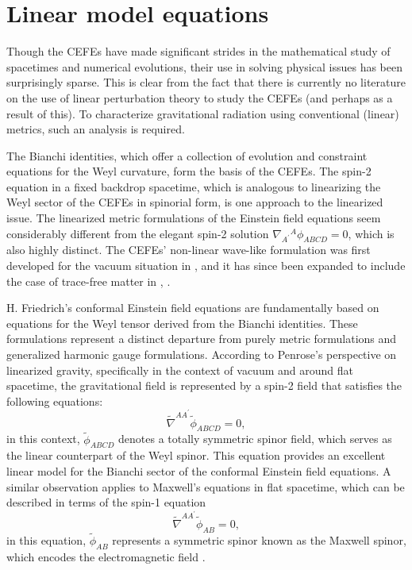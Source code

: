 \section{Linear model equations}
\label{sec:LinearModelEquations}
Though the CEFEs have made significant strides in the mathematical study of spacetimes and numerical evolutions, their use in solving physical issues has been surprisingly sparse. This is clear from the fact that there is currently no literature on the use of linear perturbation theory to study the CEFEs (and perhaps as a result of this). To characterize gravitational radiation using conventional (linear) metrics, such an analysis is required. 

The Bianchi identities, which offer a collection of evolution and constraint equations for the Weyl curvature, form the basis of the CEFEs. The spin-2 equation in a fixed backdrop spacetime, which is analogous to linearizing the Weyl sector of the CEFEs in spinorial form, is one approach to the linearized issue. The linearized metric formulations of the Einstein field equations seem considerably different from the elegant spin-2 solution $\nabla_{A^{\prime}}{ }^A \phi_{A B C D}=0$, which is also highly distinct. The CEFEs' non-linear wave-like formulation was first developed for the vacuum situation in \cite{Pae14}, and it has since been expanded to include the case of trace-free matter in \cite{CarHurKro19}, \cite{FenGas23}. 

H. Friedrich's conformal Einstein field equations are fundamentally based on equations for the Weyl tensor derived from the Bianchi identities. These formulations represent a distinct departure from purely metric formulations and generalized harmonic gauge formulations. According to Penrose's perspective on linearized gravity, specifically in the context of vacuum and around flat spacetime, the gravitational field is represented by a spin-2 field that satisfies the following equations:
\begin{equation}\label{eq:Spin2Eq}
  \tilde{\nabla}^{A A^{\prime}} \tilde{\phi}_{A B C D}=0,
\end{equation}
in this context, $\tilde{\phi}_{A B C D}$ denotes a totally symmetric spinor field, which serves as the linear counterpart of the Weyl spinor.
This equation provides an excellent linear model for the Bianchi sector of the conformal Einstein field equations. A similar observation applies to Maxwell's equations in flat spacetime, which can be described in terms of the spin-1 equation
\begin{equation}\label{eq:Spin1Eq}
  \tilde{\nabla}^{A A^{\prime}} \tilde{\phi}_{A B}=0,
\end{equation}
in this equation, $\tilde{\phi}_{A B}$ represents a symmetric spinor known as the Maxwell spinor, which encodes the electromagnetic field \cite{GasPin23}. 

